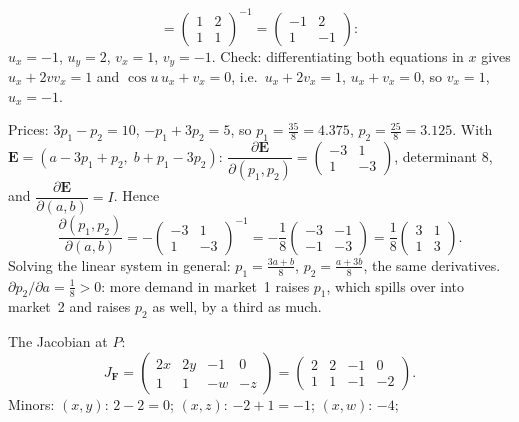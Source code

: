 \begin{solutions}
\[           =\begin{pmatrix}1&2\\1&1\end{pmatrix}^{-1}
           =\begin{pmatrix}-1&2\\1&-1\end{pmatrix}:
        \]
        $u_{x}=-1$, $u_{y}=2$, $v_{x}=1$, $v_{y}=-1$. Check: differentiating
        both equations in $x$ gives $u_{x}+2vv_{x}=1$ and
        $\cos u\,u_{x}+v_{x}=0$, i.e.\ $u_{x}+2v_{x}=1$, $u_{x}+v_{x}=0$,
        so $v_{x}=1$, $u_{x}=-1$. \checkmark
  \item Prices: $3p_{1}-p_{2}=10$, $-p_{1}+3p_{2}=5$, so
        $p_{1}=\tfrac{35}{8}=4.375$, $p_{2}=\tfrac{25}{8}=3.125$. With
        $\mathbf{E}=(a-3p_{1}+p_{2},\;b+p_{1}-3p_{2})$:
        $\dfrac{\partial\mathbf{E}}{\partial(p_{1},p_{2})}=
        \begin{pmatrix}-3&1\\1&-3\end{pmatrix}$, determinant $8$, and
        $\dfrac{\partial\mathbf{E}}{\partial(a,b)}=I$. Hence
        \[
          \frac{\partial(p_{1},p_{2})}{\partial(a,b)}
          =-\begin{pmatrix}-3&1\\1&-3\end{pmatrix}^{-1}
          =-\frac18\begin{pmatrix}-3&-1\\-1&-3\end{pmatrix}
          =\frac18\begin{pmatrix}3&1\\1&3\end{pmatrix} .
        \]
        Solving the linear system in general: $p_{1}=\tfrac{3a+b}{8}$,
        $p_{2}=\tfrac{a+3b}{8}$, the same derivatives. \checkmark\
        $\partial p_{2}/\partial a=\tfrac18>0$: more demand in market~1
        raises $p_{1}$, which spills over into market~2 and raises $p_{2}$
        as well, by a third as much.
  \item The Jacobian at $P$:
        \[
          J_{\mathbf{F}}=\begin{pmatrix}2x&2y&-1&0\\1&1&-w&-z\end{pmatrix}
          =\begin{pmatrix}2&2&-1&0\\1&1&-1&-2\end{pmatrix} .
        \]
        Minors: $(x,y)$: $2-2=0$; $(x,z)$: $-2+1=-1$; $(x,w)$: $-4$;

\end{solutions}
